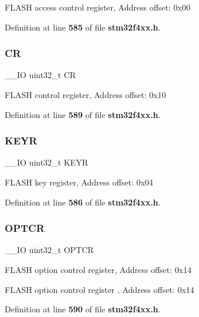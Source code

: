 F\+L\+A\+SH access control register, Address offset\+: 0x00 

Definition at line \textbf{ 585} of file \textbf{ stm32f4xx.\+h}.

\mbox{\label{structFLASH__TypeDef_ab40c89c59391aaa9d9a8ec011dd0907a}} 
\subsubsection{CR}
{\footnotesize\ttfamily \+\_\+\+\_\+\+IO uint32\+\_\+t CR}

F\+L\+A\+SH control register, Address offset\+: 0x10 

Definition at line \textbf{ 589} of file \textbf{ stm32f4xx.\+h}.

\mbox{\label{structFLASH__TypeDef_a84c491be6c66b1d5b6a2efd0740b3d0c}} 
\subsubsection{K\+E\+YR}
{\footnotesize\ttfamily \+\_\+\+\_\+\+IO uint32\+\_\+t K\+E\+YR}

F\+L\+A\+SH key register, Address offset\+: 0x04 

Definition at line \textbf{ 586} of file \textbf{ stm32f4xx.\+h}.

\mbox{\label{structFLASH__TypeDef_acfef9b6d7da4271943edc04d7dfdf595}} 
\subsubsection{O\+P\+T\+CR}
{\footnotesize\ttfamily \+\_\+\+\_\+\+IO uint32\+\_\+t O\+P\+T\+CR}

F\+L\+A\+SH option control register, Address offset\+: 0x14

F\+L\+A\+SH option control register , Address offset\+: 0x14 

Definition at line \textbf{ 590} of file \textbf{ stm32f4xx.\+h}.

\mbox{\label{structFLASH__TypeDef_a1dddf235f246a1d4e7e5084cd51e2dd0}} 
